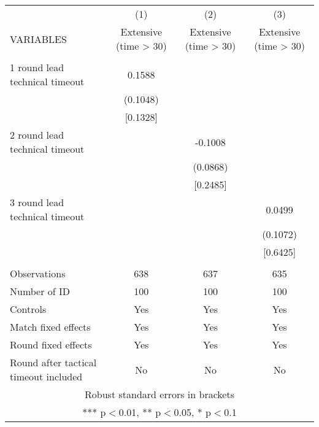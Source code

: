 \documentclass[]{article}
\begin{document}
\begin{tabular}{lccc} \hline
 & (1) & (2) & (3) \\
VARIABLES & Extensive (time > 30) & Extensive (time > 30) & Extensive (time > 30) \\ \hline
 &  &  &  \\
1 round lead technical timeout & 0.1588 &  &  \\
 & (0.1048) &  &  \\
 & [0.1328] &  &  \\
2 round lead technical timeout &  & -0.1008 &  \\
 &  & (0.0868) &  \\
 &  & [0.2485] &  \\
3 round lead technical timeout &  &  & 0.0499 \\
 &  &  & (0.1072) \\
 &  &  & [0.6425] \\
 &  &  &  \\
Observations & 638 & 637 & 635 \\
Number of ID & 100 & 100 & 100 \\
Controls & Yes & Yes & Yes \\
Match fixed effects & Yes & Yes & Yes \\
Round fixed effects & Yes & Yes & Yes \\
 Round after tactical timeout included & No & No & No \\ \hline
\multicolumn{4}{c}{ Robust standard errors in brackets} \\
\multicolumn{4}{c}{ *** p$<$0.01, ** p$<$0.05, * p$<$0.1} \\
\end{tabular}
\end{document}
